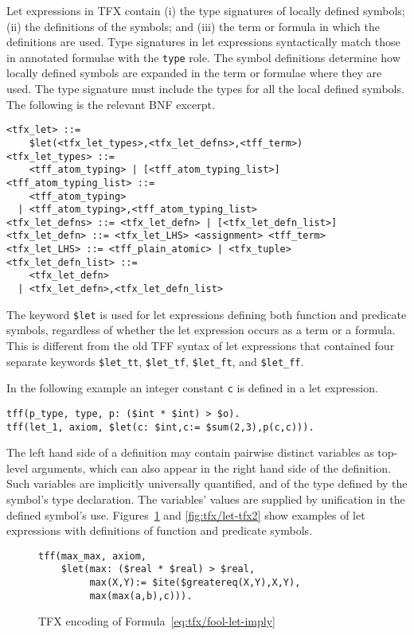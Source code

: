 Let expressions in TFX contain (i) the type signatures of locally defined 
symbols; (ii) the definitions of the symbols; and (iii) the term or formula
in which the definitions are used. 
Type signatures in let expressions syntactically match those in annotated 
formulae with the \verb'type' role. 
The symbol definitions determine how locally defined symbols are expanded 
in the term or formulae where they are used.
The type signature must include the types for all the local defined symbols.
The following is the relevant BNF excerpt.
\begin{verbatim}
<tfx_let> ::=
    $let(<tfx_let_types>,<tfx_let_defns>,<tff_term>)
<tfx_let_types> ::=
    <tff_atom_typing> | [<tff_atom_typing_list>]
<tff_atom_typing_list> ::=
    <tff_atom_typing>
  | <tff_atom_typing>,<tff_atom_typing_list>
<tfx_let_defns> ::= <tfx_let_defn> | [<tfx_let_defn_list>]
<tfx_let_defn> ::= <tfx_let_LHS> <assignment> <tff_term>
<tfx_let_LHS> ::= <tff_plain_atomic> | <tfx_tuple>
<tfx_let_defn_list> ::=
    <tfx_let_defn>
  | <tfx_let_defn>,<tfx_let_defn_list>
\end{verbatim}

The keyword \verb'$let' is used for let expressions defining both function and 
predicate symbols, regardless of whether the let expression occurs as a term 
or a formula. 
This is different from the old TFF syntax of let expressions that contained 
four separate keywords \verb'$let_tt', \verb'$let_tf', \verb'$let_ft', and 
\verb'$let_ff'.

In the following example an integer constant {\tt c} is defined in a let expression.
\begin{verbatim}
tff(p_type, type, p: ($int * $int) > $o).
tff(let_1, axiom, $let(c: $int,c:= $sum(2,3),p(c,c))).
\end{verbatim}

The left hand side of a definition may contain pairwise distinct variables 
as top-level arguments, which can also appear in the right hand side
of the definition.
Such variables are implicitly universally quantified, and of the type 
defined by the symbol's type declaration.
The variables' values are supplied by unification in the defined symbol's use.
Figures~\ref{fig:tfx/let-tfx} and \ref{fig:tfx/let-tfx2} show examples of let expressions with definitions of function and predicate symbols.

\begin{figure}[htbp]\centering
\begin{BVerbatim}
tff(max_max, axiom,
    $let(max: ($real * $real) > $real,
         max(X,Y):= $ite($greatereq(X,Y),X,Y),
         max(max(a,b),c))).
\end{BVerbatim}
\caption{TFX encoding of Formula~\ref{eq:tfx/fool-let-imply}}
\label{fig:tfx/let-tfx}
\end{figure}

